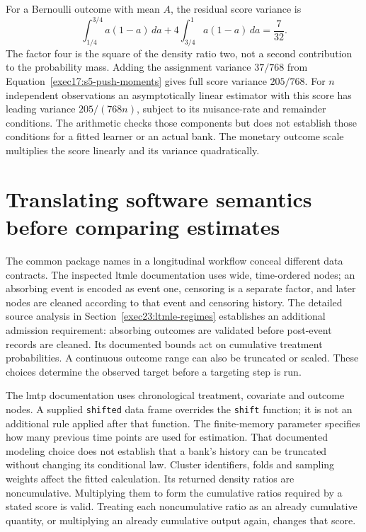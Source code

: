 For a Bernoulli outcome with mean $A$, the residual score variance is
\[
 \int_{1/4}^{3/4}a(1-a)\,da+
 4\int_{3/4}^1a(1-a)\,da=\frac7{32}.
\]
The factor four is the square of the density ratio two, not a second
contribution to the probability mass. Adding the assignment variance
$37/768$ from Equation~\eqref{exec17:s5-push-moments} gives full score
variance $205/768$. For $n$ independent observations an asymptotically
linear estimator with this score has leading variance $205/(768n)$,
subject to its nuisance-rate and remainder conditions. The arithmetic
checks those components but does not establish those conditions for a
fitted learner or an actual bank. The monetary outcome scale multiplies
the score linearly and its variance quadratically.~\citep{exec17_s5_math}

\section{Translating software semantics before comparing estimates}
\label{exec17:s5-software}

The common package names in a longitudinal workflow conceal different data
contracts. The inspected ltmle documentation uses wide, time-ordered nodes;
an absorbing event is encoded as event one, censoring is a separate factor,
and later nodes are cleaned according to that event and censoring history.
The detailed source analysis in Section~\ref{exec23:ltmle-regimes} establishes
an additional admission requirement: absorbing outcomes are validated before
post-event records are cleaned. Its documented bounds act on cumulative
treatment probabilities. A continuous outcome range can also be
truncated or scaled. These choices determine the observed target before a
targeting step is run.~\citep{sw_ltmle}

The lmtp documentation uses chronological treatment, covariate and outcome
nodes. A supplied \texttt{shifted} data frame overrides the \texttt{shift}
function; it is not an additional rule applied after that function. The
finite-memory parameter specifies how many previous time points are used
for estimation. That documented modeling choice does not establish that a
bank's history can be truncated without changing its conditional law.
Cluster identifiers, folds and sampling weights affect the fitted calculation.
Its returned density ratios are noncumulative. Multiplying them to form the
cumulative ratios required by a stated score is valid. Treating each
noncumulative ratio as an already cumulative quantity, or multiplying an
already cumulative output again, changes that score.~\citep{sw_lmtp}

